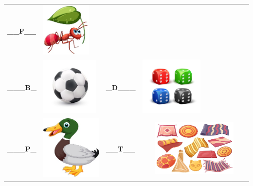 \begin{longtable}[]{@{}llll@{}}
\textbf{\_\_F\_\_} &
\includegraphics[width=0.97986in,height=1.05208in]{media/image21.jpeg}\tabularnewline
\textbf{\_\_\_B\_} &
\includegraphics[width=1.13542in,height=1.13542in]{media/image22.jpeg} &
\textbf{\_D\_\_\_} &
\includegraphics[width=1.23958in,height=1.15833in]{media/image23.jpeg}\tabularnewline
\textbf{\_\_\_P\_} &
\includegraphics[width=1.19722in,height=1.27083in]{media/image24.jpeg} &
\textbf{\_\_T\_\_} &
\includegraphics[width=2.21875in,height=1.11458in]{media/image25.jpeg}\tabularnewline
\bottomrule
\end{longtable}

